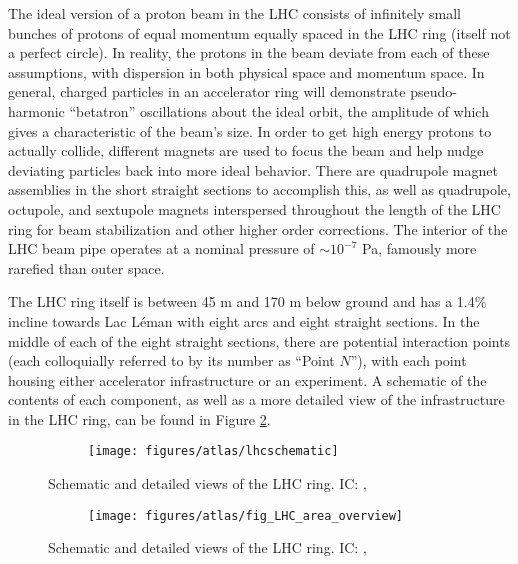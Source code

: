The ideal version of a proton beam in the LHC consists of infinitely small bunches of protons of equal momentum equally spaced in the LHC ring (itself not a perfect circle).  In reality, the protons in the beam deviate from each of these assumptions, with dispersion in both physical space and momentum space.  In general, charged particles in an accelerator ring will demonstrate pseudo-harmonic ``betatron'' oscillations about the ideal orbit, the amplitude of which gives a characteristic of the beam's size.  In order to get high energy protons to actually collide, different magnets are used to focus the beam and help nudge deviating particles back into more ideal behavior.  There are quadrupole magnet assemblies in the short straight sections to accomplish this, as well as quadrupole, octupole, and sextupole magnets interspersed throughout the length of the LHC ring for beam stabilization and other higher order corrections.  The interior of the LHC beam pipe operates at a nominal pressure of $\sim10^{-7}$ Pa, famously more rarefied than outer space.

  The LHC ring itself is between 45 m and 170 m below ground and has a 1.4\% incline towards Lac L\'eman with eight arcs and eight straight sections.  In the middle of each of the eight straight sections, there are potential interaction points (each colloquially referred to by its number as ``Point $N$''), with each point housing either accelerator infrastructure or an experiment.  A schematic of the contents of each component, as well as a more detailed view of the infrastructure in the LHC ring, can be found in Figure \ref{fig:lhcring}.

\begin{figure}[!htbp]\captionsetup{justification=centering}
  \centering
  \begin{subfigure}[t]{0.4950000\linewidth}\centering\texttt{[image: figures/atlas/lhcschematic]}\caption{}\end{subfigure}
  \caption{Schematic and detailed views of the LHC ring. IC: \cite{lhccartoon}, \cite{lhcdetail}}
  \label{fig:lhccartoon}
\end{figure}

\begin{landscape}
\begin{figure}[!htbp]\captionsetup{justification=centering}
  \centering
  \begin{subfigure}[t]{\linewidth}\centering\texttt{[image: figures/atlas/fig\_LHC\_area\_overview]}\caption{}\end{subfigure}
  \caption{Schematic and detailed views of the LHC ring. IC: \cite{lhccartoon}, \cite{lhcdetail}}
  \label{fig:lhcring}
\end{figure}
\end{landscape}

